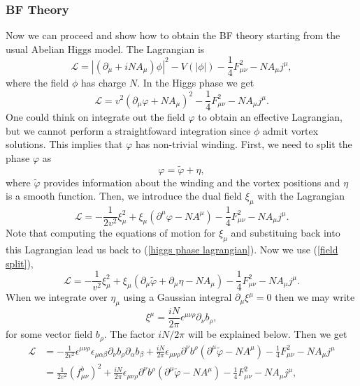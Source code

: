 \documentclass{article}
\renewcommand{\L}{\mathcal{L}}
\begin{document}
\subsubsection{BF Theory}
Now we can proceed and show how to obtain the BF theory starting from the usual Abelian Higgs model. The Lagrangian is 
\begin{equation}
	\L=|(\partial_\mu+iNA_\mu)\phi|^2-V(|\phi|)-\frac{1}{4}F_{\mu\nu}^2-NA_\mu j^{\mu},
\end{equation}
where the field $\phi$ has charge $N$. In the Higgs phase we get 
\begin{equation}\label{higgs phase lagrangian}
	\L = v^2(\partial_\mu\varphi+NA_\mu)^2-\frac{1}{4}F_{\mu\nu}^2-NA_\mu j^{\mu}.
\end{equation}
One could think on integrate out the field $\varphi$ to obtain an effective Lagrangian, but we cannot perform a straightfoward integration since  $\phi$ admit vortex solutions.
This implies that $\varphi$ has non-trivial winding. First, we need to split the phase $\varphi$ as
\begin{equation}\label{field split}
	\varphi=\tilde{\varphi}+\eta,
\end{equation}
where $\tilde{\varphi}$ provides information about the winding and the vortex positions and $\eta$ is a smooth function.
Then, we introduce the dual field $\xi_\mu$ with the Lagrangian
\begin{equation}
	\mathcal{L} = -\frac{1}{2v^2}\xi_\mu^2 + \xi_\mu(\partial^\mu\varphi-NA^\mu)-\frac{1}{4}F_{\mu\nu}^2-NA_\mu j^{\mu}.
\end{equation}
Note that computing the equations of motion for $\xi_\mu$ and substituing back into this Lagrangian lead us back to (\ref{higgs phase lagrangian}). Now we use (\ref{field split}), 
\begin{equation}
	\mathcal{L} = -\frac{1}{v^2}\xi_\mu^2 + \xi_\mu(\partial_\mu\tilde{\varphi}+\partial_\mu\eta - NA_\mu)-\frac{1}{4}F_{\mu\nu}^2-NA_\mu j^{\mu}.
\end{equation}
When we integrate over $\eta_\mu$ using a Gaussian integral  $\partial_\mu\xi^\mu=0$ then we may write
\begin{equation}
	\xi^{\mu}=\frac{iN}{2\pi}\epsilon^{\mu\nu\rho}\partial_\nu b_\rho,
\end{equation}
for some vector field $b_\rho$. The factor $iN/2\pi$ will be explained below. Then we get
\begin{equation}
	\begin{split}
		\mathcal{L} &= -\frac{1}{2v^2}\epsilon^{\mu\nu\rho}\epsilon_{\mu\alpha\beta}\partial_\nu b_\rho\partial_\alpha b_\beta + \frac{iN}{2\pi}\epsilon_{\mu\nu\rho}\partial^\nu b^{\rho}(\partial^\mu\tilde{\varphi}-NA^\mu) -\frac{1}{4}F_{\mu\nu}^2-NA_\mu j^{\mu} \\&
		= \frac{1}{2v^2}(f_{\mu\nu}^b)^2+ \frac{iN}{2\pi}\epsilon_{\mu\nu\rho}\partial^\nu b^{\rho}(\partial^\mu\tilde{\varphi}-NA^\mu) -\frac{1}{4}F_{\mu\nu}^2-NA_\mu j^{\mu},
	\end{split}
\end{equation}
\end{document}
